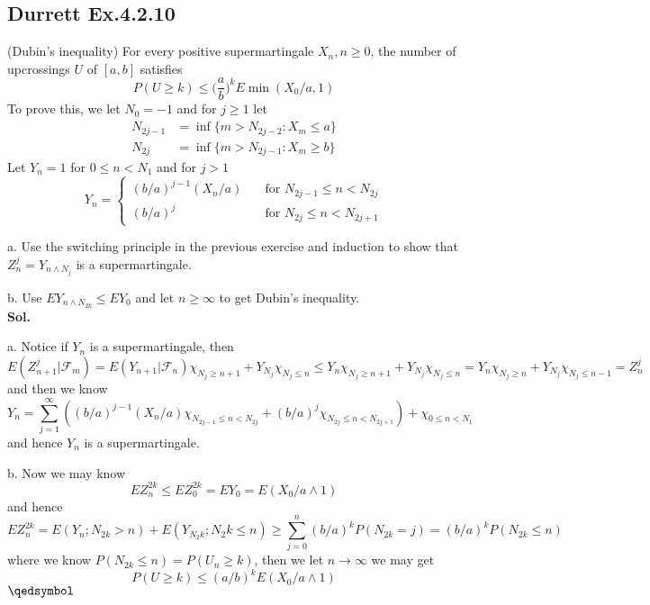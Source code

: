 \documentclass[lang=en,11pt,a4paper,citestyle =authoryear]{elegantpaper}
\newcommand{\prvd}{$\hfill \qedsymbol$}
\newcommand{\F}{\mathcal{F}}
\begin{document}
\subsection*{Durrett Ex.4.2.10} 
(Dubin's inequality) For every positive supermartingale $X_n, n\geq 0$, the number of upcrossings $U$ of $[a,b]$ satisfies
\[P(U\geq k) \leq \Big(\dfrac{a}{b}\Big)^k E \min(X_0/a,1)\]
To prove this, we let $N_0 = -1$ and for $j\geq 1$ let
\[
\begin{aligned}
    N_{2j-1} &= \inf\{m>N_{2j-2}:X_m \leq a\} \\
    N_{2j} &= \inf\{m>N_{2j-1}:X_m \geq b\} 
\end{aligned}
\]
Let $Y_n = 1$ for $0 \leq n < N_1$ and for $j>1$
\[
Y_n = \begin{cases}
    (b/a)^{j-1}(X_n/a)\quad&\text{for }N_{2j-1}\leq n < N_{2j} \\
    (b/a)^j&\text{for }N_{2j}\leq n<N_{2j+1}
\end{cases}
\]\par
a. Use the switching principle in the previous exercise and induction to show that $Z_n^j = Y_{n\wedge N_j}$ is a supermartingale.\par
b. Use $EY_{n\wedge N_{2k}} \leq EY_0$ and let $n\geq \infty$ to get Dubin's inequality.
\vspace{0.5em}\\
\textbf{Sol.} \par
a. Notice if $Y_n$ is a supermartingale, then
\[
E(Z_{n+1}^j|\F_m) = E(Y_{n+1}|\F_n)\chi_{N_j \geq n+1} + Y_{N_j}\chi_{N_j \leq n} \leq Y_n\chi_{N_j \geq n+1} + Y_{N_j}\chi_{N_j \leq n} = Y_n\chi_{N_j \geq n} + Y_{N_j}\chi_{N_j \leq n-1} = Z_n^j
\]
and then we know
\[
Y_n = \sum\limits_{j=1}^{\infty} ((b/a)^{j-1}(X_n/a)\chi_{N_{2j-1} \leq n < N_{2j}} + (b/a)^j\chi_{N_{2j}\leq n < N_{2j+1}}) + \chi_{0\leq n< N_1}
\]
and hence $Y_n$ is a supermartingale.\par
b. Now we may know
\[ EZ_n^{2k} \leq EZ_0^{2k} = EY_0 = E(X_0/a\wedge 1) \]
and hence
\[
EZ_n^{2k} = E(Y_{n};N_{2k} > n) + E(Y_{N_2k}; N_2k \leq n) \geq \sum\limits_{j=0}^n (b/a)^kP(N_{2k} = j) = (b/a)^k P(N_{2k} \leq n) 
\]
where we know $P(N_{2k} \leq n ) = P(U_n \geq k)$, then we let $n\to\infty$ we may get
\[P(U\geq k) \leq (a/b)^k E(X_0/a\wedge 1)\]
\prvd
\vspace{0.5em}

\addappheadtotoc
\end{document}
